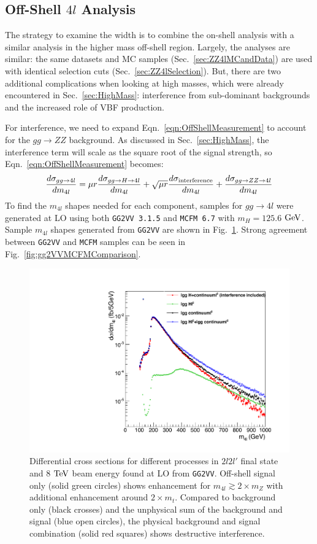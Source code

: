 \subsection{Off-Shell $4l$ Analysis}
\label{sec:OffShellAnalysis}

The strategy to examine the width is to combine the on-shell analysis with a similar analysis in the higher mass off-shell region. Largely, the analyses are similar: the same datasets and MC samples (Sec.~\ref{sec:ZZ4lMCandData}) are used with identical selection cuts (Sec.~\ref{sec:ZZ4lSelection}). But, there are two additional complications when looking at high masses, which were already encountered in Sec.~\ref{sec:HighMass}: interference from sub-dominant backgrounds and the increased role of VBF production.

For interference, we need to expand Eqn.~\ref{eqn:OffShellMeasurement} to account for the $gg\rightarrow ZZ$ background. As discussed in Sec.~\ref{sec:HighMass}, the interference term will scale as the square root of the signal strength, so Eqn.~\ref{eqn:OffShellMeasurement} becomes:
\begin{equation}
\frac{d\sigma_{gg\rightarrow 4l}}{dm_{4l}} = \mu r \frac{d\sigma_{gg\rightarrow H \rightarrow 4l}}{dm_{4l}} + \sqrt{\mu r} \frac{d\sigma_{\rm interference}}{dm_{4l}} + \frac{d\sigma_{gg\rightarrow ZZ \rightarrow 4l}}{dm_{4l}}
\label{eqn:OffShellDiff_ZZ}
\end{equation}
To find the $m_{4l}$ shapes needed for each component, samples for $gg\rightarrow 4l$ were generated at LO using both {\tt GG2VV 3.1.5} and {\tt MCFM 6.7} with $m_H=125.6$ $\rm{GeV}$. Sample $m_{4l}$ shapes generated from {\tt GG2VV} are shown in Fig.~\ref{fig:gg2VVDiffXSec}. Strong agreement between {\tt GG2VV} and {\tt MCFM} samples can be seen in Fig.~\ref{fig:gg2VVMCFMComparison}.

\begin{figure}[htbp]
\begin{center}
\includegraphics[width=.5\linewidth]{HiggsProperties/figures/gg2VV.pdf}
\caption[Differential Cross Section at LO from gg2VV for Off-shell Region]{Differential cross sections for different processes in $2l2l'$ final state and 8 $\rm{TeV}$ beam energy found at LO from {\tt GG2VV}. Off-shell signal only (solid green circles) shows enhancement for $m_{4l} \gtrsim 2\times m_Z$ with additional enhancement around $2\times m_{t}$. Compared to background only (black crosses) and the unphysical sum of the background and signal (blue open circles), the physical background and signal combination (solid red squares) shows destructive interference.}
\label{fig:gg2VVDiffXSec}
\end{center}
\end{figure}

